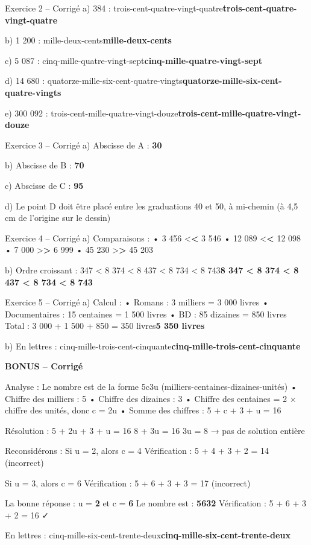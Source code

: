 \documentclass[11pt,a4paper]{article}
\DeclareRobustCommand{\rep}[1]{\begingroup\color{warning}\ifmmode #1\else \textbf{#1}\fi\endgroup}
\begin{document}
	\begin{exercisebox}{ Exercice 2 – Corrigé}
		a) 384 : \rep{trois-cent-quatre-vingt-quatre}
		
		b) 1 200 : \rep{mille-deux-cents}
		
		c) 5 087 : \rep{cinq-mille-quatre-vingt-sept}
		
		d) 14 680 : \rep{quatorze-mille-six-cent-quatre-vingts}
		
		e) 300 092 : \rep{trois-cent-mille-quatre-vingt-douze}
	\end{exercisebox}
	
	\begin{exercisebox}{ Exercice 3 – Corrigé}
		a) Abscisse de A : \rep{30}
		
		b) Abscisse de B : \rep{70}
		
		c) Abscisse de C : \rep{95}
		
		d) Le point D doit être placé entre les graduations 40 et 50, à mi-chemin (à 4,5 cm de l'origine sur le dessin)
	\end{exercisebox}
	
	\begin{exercisebox}{ Exercice 4 – Corrigé}
		a) Comparaisons :
		• 3 456 \rep{<} 3 546
		• 12 089 \rep{<} 12 098
		• 7 000 \rep{>} 6 999
		• 45 230 \rep{>} 45 203
		
		b) Ordre croissant : \rep{8 347 < 8 374 < 8 437 < 8 734 < 8 743}
	\end{exercisebox}
	
	\begin{exercisebox}{ Exercice 5 – Corrigé}
		a) Calcul :
		• Romans : 3 milliers = 3 000 livres
		• Documentaires : 15 centaines = 1 500 livres
		• BD : 85 dizaines = 850 livres
		Total : 3 000 + 1 500 + 850 = \rep{5 350 livres}
		
		b) En lettres : \rep{cinq-mille-trois-cent-cinquante}
	\end{exercisebox}
	
	\begin{tcolorbox}[colback=accent!10,colframe=accent]
		\textbf{BONUS – Corrigé}
		
		Analyse : Le nombre est de la forme 5c3u (milliers-centaines-dizaines-unités)
		• Chiffre des milliers : 5
		• Chiffre des dizaines : 3  
		• Chiffre des centaines = 2 $\times$ chiffre des unités, donc c = 2u
		• Somme des chiffres : 5 + c + 3 + u = 16
		
		Résolution : 5 + 2u + 3 + u = 16
		8 + 3u = 16
		3u = 8 → pas de solution entière
		
		Reconsidérons : Si u = 2, alors c = 4
		Vérification : 5 + 4 + 3 + 2 = 14 (incorrect)
		
		Si u = 3, alors c = 6
		Vérification : 5 + 6 + 3 + 3 = 17 (incorrect)
		
		La bonne réponse : u = \rep{2} et c = \rep{6}
		Le nombre est : \rep{5632}
		Vérification : 5 + 6 + 3 + 2 = 16 ✓
		
		En lettres : \rep{cinq-mille-six-cent-trente-deux}
	\end{tcolorbox}
	
\end{document}
